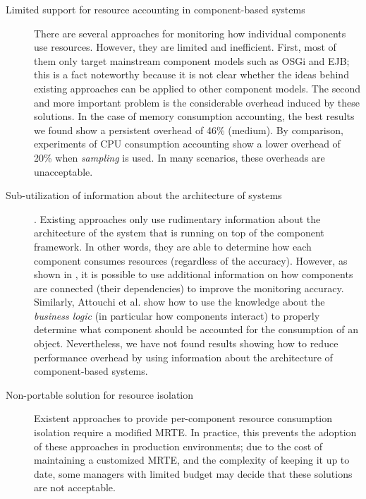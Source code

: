 \begin{description}

\item[Limited support for resource accounting in component-based systems] There are several approaches for monitoring how individual components use resources.
However, they are limited and inefficient.
First, most of them only target mainstream component models such as OSGi and EJB; this is a fact noteworthy because it is not clear whether the ideas behind existing approaches can be applied to other component models.
The second and more important problem is the considerable overhead induced by these solutions.
In the case of memory consumption accounting, the best results we found show a persistent overhead of 46\% (medium).
By comparison, experiments of CPU consumption accounting show a lower overhead of 20\% when \textit{sampling} is used.
In many scenarios, these overheads are unacceptable. 

\item[Sub-utilization of information about the architecture of systems].
Existing approaches only use rudimentary information about the architecture of the system that is running on top of the component framework.
In other words, they are able to determine how each component consumes resources (regardless of the accuracy).
However, as shown in \cite{Maurel:2012:AME:2304736.2304763}, it is possible to use additional information on how components are connected (their dependencies) to improve the monitoring accuracy.
Similarly, Attouchi et al. \cite{Attouchi:2014:MMM:2602458.2602467} show how to use the knowledge about the \textit{business logic} (in particular how components interact) to properly determine what component should be accounted for the consumption of an object.
Nevertheless, we have not found results showing how to reduce performance overhead by using information about the architecture of component-based systems. 


\item[Non-portable solution for resource isolation] Existent approaches to provide per-component resource consumption isolation require a modified MRTE.
In practice, this prevents the adoption of these approaches in production environments; due to the cost of maintaining a customized MRTE, and the complexity of keeping it up to date, some managers with limited budget may decide that these solutions are not acceptable.



\end{description}
